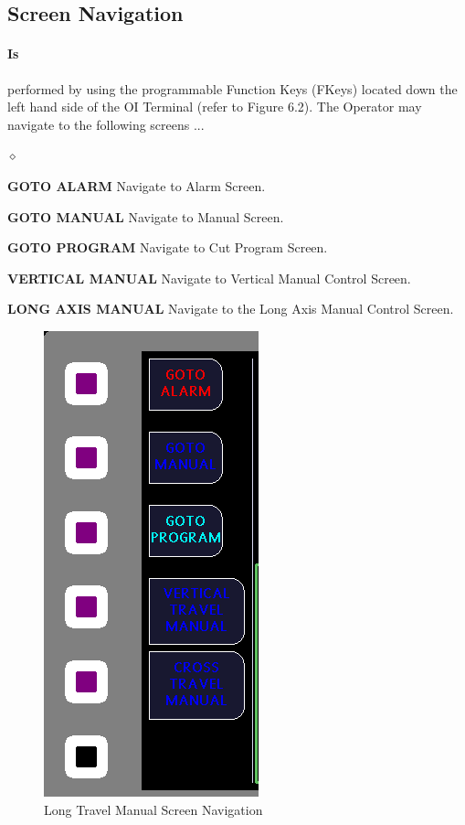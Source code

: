 \subsection{Screen Navigation}
\paragraph*{Is}performed by using the programmable Function Keys (FKeys) located down the left hand side of the OI Terminal (refer to Figure 6.2). The Operator may navigate to the following screens ...
\begin{list}{$\diamond$}{}
	\item \textbf{GOTO ALARM} Navigate to Alarm Screen.
	\item \textbf{GOTO MANUAL} Navigate to Manual Screen.
	\item \textbf{GOTO PROGRAM} Navigate to Cut Program Screen.
	\item \textbf{VERTICAL MANUAL} Navigate to Vertical Manual Control Screen.
	\item \textbf{LONG AXIS MANUAL} Navigate to the Long Axis Manual Control Screen.
\end{list}
\begin{figure}
	\centering
	\includegraphics[width=0.2\linewidth]{screen-captures/manual/long-manual-nav}
	\caption{Long Travel Manual Screen Navigation}
	\label{fig:manual-long-screen-nav}
\end{figure}
